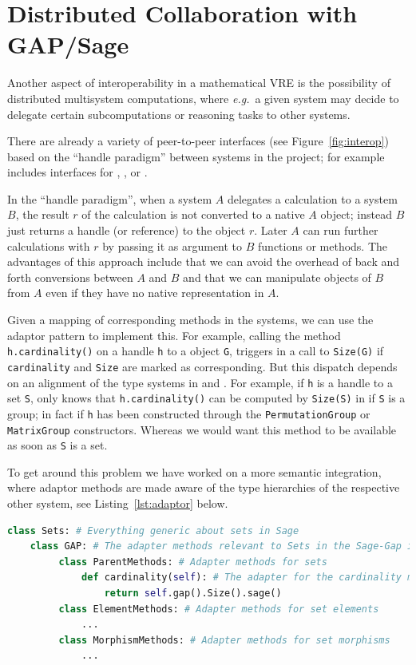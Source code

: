 \section{Distributed Collaboration with GAP/Sage}\label{sec:gapsage}
\label{sec:handles}

Another aspect of interoperability in a mathematical VRE is the possibility of distributed
multisystem computations, where \emph{e.g.}\ a given system may decide to delegate
certain subcomputations or reasoning tasks to other systems.

There are already a variety of peer-to-peer interfaces (see Figure~\ref{fig:interop})
based on the ``handle paradigm'' between systems in the \ODK project;
for example \Sage includes interfaces for \GAP, \Singular, or \Pari.

In the ``handle paradigm'', when a system $A$ delegates a calculation to a system $B$, the
result $r$ of the calculation is not converted to a native $A$ object; instead $B$ just
returns a handle (or reference) to the object $r$. Later $A$ can run further calculations
with $r$ by passing it as argument to $B$ functions or methods. The advantages of this
approach include that we can avoid the overhead of back and forth conversions between $A$
and $B$ and that we can manipulate objects of $B$ from $A$ even if they have no native
representation in $A$.

Given a mapping of corresponding methods in the systems, we can use the adaptor pattern to
implement this. For example, calling the method \texttt{h.cardinality()} on a \Sage handle
\texttt{h} to a \GAP object \texttt{G}, triggers in \GAP a call to \texttt{Size(G)} if
\texttt{cardinality} and \texttt{Size} are marked as corresponding. But this dispatch
depends on an alignment of the type systems in \Sage and \GAP. For example, if \texttt{h}
is a handle to a set \texttt{S}, \Sage only knows that \texttt{h.cardinality()} can be
computed by \texttt{Size(S)} in \GAP if \texttt{S} is a group; in fact if \texttt{h} has
been constructed through the \texttt{PermutationGroup} or \texttt{MatrixGroup}
constructors. Whereas we would want this method to be available as soon as \texttt{S} is a
set.

To get around this problem we have worked on a more semantic integration, where adaptor
methods are made aware of the type hierarchies of the respective other system, see
Listing~\ref{lst:adaptor} below. 
\begin{lstlisting}[language=Python,label=lst:adaptor,
  caption=A Semantic Adaptor Method in \Sage]
class Sets: # Everything generic about sets in Sage
    class GAP: # The adapter methods relevant to Sets in the Sage-Gap interface
         class ParentMethods: # Adapter methods for sets
             def cardinality(self): # The adapter for the cardinality method
                 return self.gap().Size().sage()
         class ElementMethods: # Adapter methods for set elements
             ...
         class MorphismMethods: # Adapter methods for set morphisms
             ...
\end{lstlisting}

